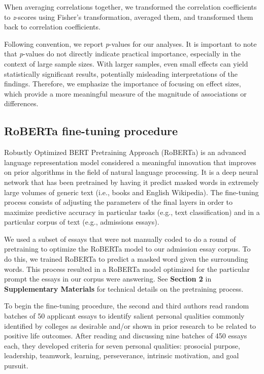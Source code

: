 \documentclass[11pt]{report}
\begin{document}
\begin{mainf}
When averaging correlations together, we transformed the correlation coefficients to \textit{z}-scores using Fisher’s transformation, averaged them, and transformed them back to correlation coefficients.

Following convention, we report \textit{p}-values for our analyses. It is important to note that \textit{p}-values do not directly indicate practical importance, especially in the context of large sample sizes. With larger samples, even small effects can yield statistically significant results, potentially misleading interpretations of the findings. Therefore, we emphasize the importance of focusing on effect sizes, which provide a more meaningful measure of the magnitude of associations or differences. 

\subsection{RoBERTa fine-tuning procedure}

Robustly Optimized BERT Pretraining Approach (RoBERTa) \cite{liu_roberta_2019} is an advanced language representation model considered a meaningful innovation that improves on prior algorithms in the field of natural language processing. It is a deep neural network that has been pretrained by having it predict masked words in extremely large volumes of generic text (i.e., books and English Wikipedia). 
The fine-tuning process consists of adjusting the parameters of the final layers in order to maximize predictive accuracy in particular tasks (e.g., text classification) and in a particular corpus of text (e.g., admissions essays). 

We used a subset of essays that were not manually coded to do a round of pretraining to optimize the RoBERTa model to our admission essay corpus. To do this, we trained RoBERTa to predict a masked word given the surrounding words. This process resulted in a RoBERTa model optimized for the particular prompt the essays in our corpus were answering. See \textbf{Section 2} in \textbf{Supplementary Materials} for technical details on the pretraining process.

To begin the fine-tuning procedure, the second and third authors read random batches of 50 applicant essays to identify salient personal qualities commonly identified by colleges as desirable and/or shown in prior research to be related to positive life outcomes. After reading and discussing nine batches of 450 essays each, they developed criteria for seven personal qualities: prosocial purpose, leadership, teamwork, learning, perseverance, intrinsic motivation, and goal pursuit.


\end{mainf}
\end{document}
